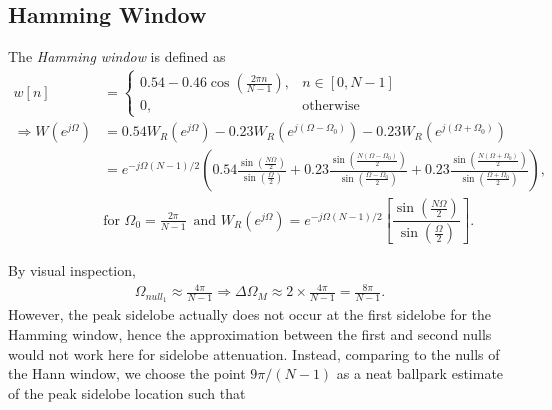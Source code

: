 \documentclass{report}
\begin{document}
\subsection{Hamming Window}
The \emph{Hamming window} is defined as 
\begin{align}
    w[n] &= \begin{cases}
        0.54-0.46\cos\left(\frac{2\pi n}{N-1}\right), & n\in[0,N-1] \\
        0, & \text{otherwise}
    \end{cases} \\
    \Longrightarrow W(e^{j\Omega}) &= 0.54W_R(e^{j\Omega}) - 0.23W_R(e^{j(\Omega-\Omega_0)}) - 0.23W_R(e^{j(\Omega+\Omega_0)}) \nonumber \\
    &= e^{-j\Omega(N-1)/2} \left(0.54\frac{\sin\left(\frac{N\Omega}{2}\right)}{\sin\left(\frac{\Omega}{2}\right)}+0.23\frac{\sin\left(\frac{N\left(\Omega-\Omega_0\right)}{2}\right)}{\sin\left(\frac{\Omega-\Omega_0}{2}\right)}+0.23\frac{\sin\left(\frac{N\left(\Omega+\Omega_0\right)}{2}\right)}{\sin\left(\frac{\Omega+\Omega_0}{2}\right)}\right), \nonumber \\
    &\text{for } \Omega_0 = \frac{2\pi}{N-1}\, \text{ and } W_R(e^{j\Omega}) = e^{-j\Omega(N-1)/2}\left[\dfrac{\sin\left(\frac{N\Omega}{2}\right)}{\sin\left(\frac{\Omega}{2}\right)}\right].
\end{align}
\begin{center}
\end{center}
By visual inspection, 
\begin{align*}
    \Omega_{null_1} \approx \frac{4\pi}{N-1} \Longrightarrow \Delta\Omega_M \approx 2 \times \frac{4\pi}{N-1} = \frac{8\pi}{N-1}.
\end{align*}
However, the peak sidelobe actually does not occur at the first sidelobe for the Hamming window, hence the approximation between the first and second nulls would not work here for sidelobe attenuation. Instead, comparing to the nulls of the Hann window, we choose the point $9\pi/(N-1)$ as a neat ballpark estimate of the peak sidelobe location such that 
\end{document}
